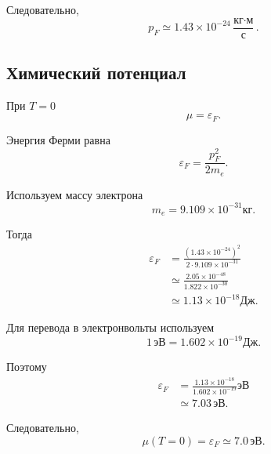 \documentclass[../final.tex]{subfiles}
\begin{document}
Следовательно,
%
\begin{equation*}
    \boxed{
        p_F
        \simeq
        1.43\times10^{-24}
        \frac{
            \text{кг}\cdot\text{м}
        }{
            \text{с}
        }
    }.
\end{equation*}



\subsection*{Химический потенциал}

При $T=0$
%
\begin{equation*}
    \mu
    =
    \varepsilon_F.
\end{equation*}

Энергия Ферми равна
%
\begin{equation*}
    \varepsilon_F
    =
    \frac{
        p_F^2
    }{
        2m_e
    }.
\end{equation*}

Используем массу электрона
%
\begin{equation*}
    m_e
    =
    9.109\times10^{-31}
    \text{кг}.
\end{equation*}

Тогда
%
\begin{align*}
    \varepsilon_F
    &=
    \frac{
        (1.43\times10^{-24})^2
    }{
        2\cdot9.109\times10^{-31}
    }
    \\[5pt]
    &\simeq
    \frac{
        2.05\times10^{-48}
    }{
        1.822\times10^{-30}
    }
    \\[5pt]
    &\simeq
    1.13\times10^{-18}
    \text{Дж}.
\end{align*}

Для перевода в электронвольты используем
%
\begin{equation*}
    1\,\text{эВ}
    =
    1.602\times10^{-19}
    \text{Дж}.
\end{equation*}

Поэтому
%
\begin{align*}
    \varepsilon_F
    &=
    \frac{
        1.13\times10^{-18}
    }{
        1.602\times10^{-19}
    }
    \text{эВ}
    \\[3pt]
    &\simeq
    7.03\,\text{эВ}.
\end{align*}

Следовательно,
%
\begin{equation*}
    \boxed{
        \mu(T=0)
        =
        \varepsilon_F
        \simeq
        7.0\,\text{эВ}
    }.
\end{equation*}
\end{document}
